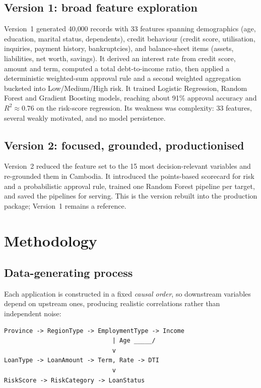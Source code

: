 \documentclass[conference]{IEEEtran}
\begin{document}
\subsection{Version 1: broad feature exploration}
Version~1 generated 40{,}000 records with 33 features spanning demographics
(age, education, marital status, dependents), credit behaviour (credit score,
utilisation, inquiries, payment history, bankruptcies), and balance-sheet items
(assets, liabilities, net worth, savings). It derived an interest rate from
credit score, amount and term, computed a total debt-to-income ratio, then
applied a deterministic weighted-sum approval rule and a second weighted
aggregation bucketed into Low/Medium/High risk. It trained Logistic Regression,
Random Forest and Gradient Boosting models, reaching about 91\% approval
accuracy and $R^2 \approx 0.76$ on the risk-score regression. Its weakness was
complexity: 33 features, several weakly motivated, and no model persistence.

\subsection{Version 2: focused, grounded, productionised}
Version~2 reduced the feature set to the 15 most decision-relevant variables and
re-grounded them in Cambodia. It introduced the points-based scorecard for risk
and a probabilistic approval rule, trained one Random Forest pipeline per
target, and saved the pipelines for serving. This is the version rebuilt into
the production package; Version~1 remains a reference.

\section{Methodology}

\subsection{Data-generating process}
Each application is constructed in a fixed \emph{causal order}, so downstream
variables depend on upstream ones, producing realistic correlations rather than
independent noise:
\begin{lstlisting}
Province -> RegionType -> EmploymentType -> Income
                              | Age _____/
                              v
LoanType -> LoanAmount -> Term, Rate -> DTI
                              v
RiskScore -> RiskCategory -> LoanStatus
\end{lstlisting}
\end{document}
